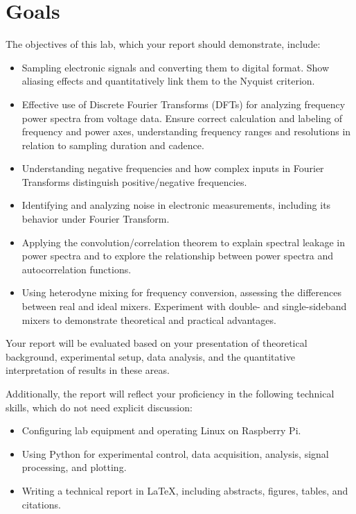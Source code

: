 \documentclass[11pt,preprint]{aastex}
\begin{document}
\section{Goals} \label{goals}

\noindent
The objectives of this lab, which your report should demonstrate, include:

\begin{itemize}
    \item Sampling electronic signals and converting them to digital format. Show aliasing effects and quantitatively link them to the Nyquist criterion.
    \item Effective use of Discrete Fourier Transforms (DFTs) for analyzing frequency power spectra from voltage data. Ensure correct calculation and labeling of frequency and power axes, understanding frequency ranges and resolutions in relation to sampling duration and cadence.
    \item Understanding negative frequencies and how complex inputs in Fourier Transforms distinguish positive/negative frequencies.
    \item Identifying and analyzing noise in electronic measurements, including its behavior under Fourier Transform.
    \item Applying the convolution/correlation theorem to explain spectral leakage in power spectra and to explore the relationship between power spectra and autocorrelation functions.
    \item Using heterodyne mixing for frequency conversion, assessing the differences between real and ideal mixers. Experiment with double- and single-sideband mixers to demonstrate theoretical and practical advantages.
\end{itemize}

\noindent
Your report will be evaluated based on your presentation of theoretical background, experimental setup, data analysis, and the quantitative interpretation of results in these areas.

Additionally, the report will reflect your proficiency in the following technical skills, which do not need explicit discussion:

\begin{itemize}
    \item Configuring lab equipment and operating Linux on Raspberry Pi.
    \item Using Python for experimental control, data acquisition, analysis, signal processing, and plotting.
    \item Writing a technical report in \LaTeX, including abstracts, figures, tables, and citations.
\end{itemize}
\end{document}
